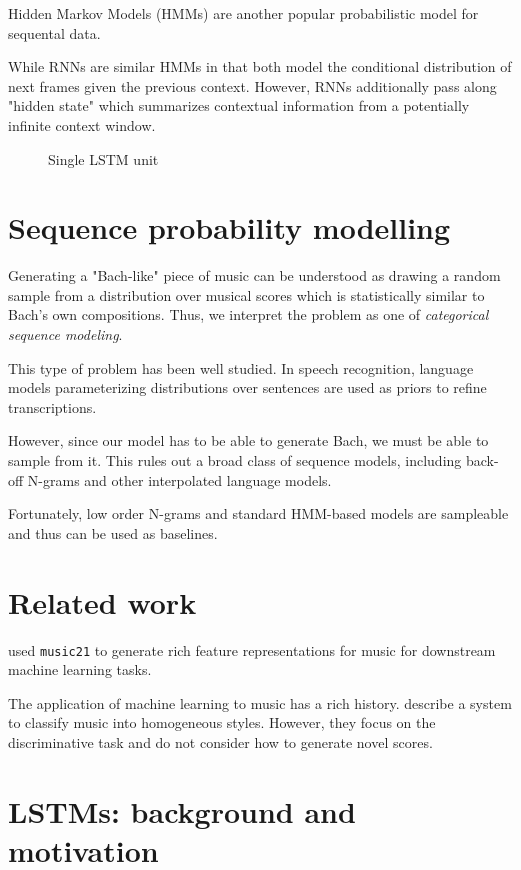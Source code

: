 \documentclass[dissertation.tex]{subfile}
\begin{document}
Hidden Markov Models (HMMs) are another popular probabilistic model for
sequental data. 

While RNNs are similar HMMs in that both model the conditional distribution of
next frames given the previous context. However, RNNs additionally pass along
"hidden state" which summarizes contextual information from a potentially
infinite context window.


\begin{figure}[htpb]
    \centering
    
    \caption{Single LSTM unit}
    \label{fig:lstm-unit}
\end{figure}


\section{Sequence probability modelling}

Generating a "Bach-like" piece of music can be understood as drawing a random
sample from a distribution over musical scores which is statistically similar
to Bach's own compositions. Thus, we interpret the problem as one of
\emph{categorical sequence modeling}.

This type of problem has been well studied. In speech recognition, language
models parameterizing distributions over sentences are used as priors to refine
transcriptions.

However, since our model has to be able to generate Bach, we must be able to
sample from it. This rules out a broad class of sequence models, including
back-off N-grams and other interpolated language models.

Fortunately, low order N-grams and standard HMM-based models are sampleable and
thus can be used as baselines.

\section{Related work}

\cite{Cuthbert2011} used
\texttt{music21} to generate rich feature representations for music for
downstream machine learning tasks.

The application of machine learning to music has a rich history.
\cite{Herlands2014} describe a system to classify music into homogeneous
styles. However, they focus on the discriminative task and do not consider
how to generate novel scores.


\section{LSTMs: background and motivation}
\end{document}
